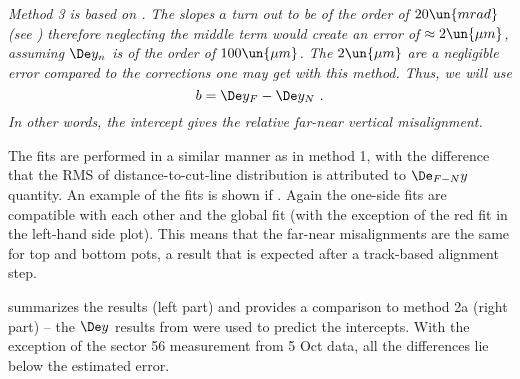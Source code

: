 


\em{Method 3} is based on . The slopes $a$ turn out to be of the order of $20\un{mrad}$ (see ) therefore neglecting the middle term would create an error of $\approx 2\un{\mu m}$, assuming $\De y_n$ is of the order of $100\un{\mu m}$. The $2\un{\mu m}$ are a negligible error compared to the corrections one may get with this method. Thus, we will use
$$b = \De y_F - \De y_N\ .$$
In other words, the intercept gives the relative far-near vertical misalignment.

The fits are performed in a similar manner as in method 1, with the difference that the RMS of distance-to-cut-line distribution is attributed to $\De_{F-N} y$ quantity. An example of the fits is shown if . Again the one-side fits are compatible with each other and the global fit (with the exception of the red fit in the left-hand side plot). This means that the far-near misalignments are the same for top and bottom pots, a result that is expected after a track-based alignment step.

 summarizes the results (left part) and provides a comparison to method 2a (right part) -- the $\De y$ results from  were used to predict the intercepts. With the exception of the sector 56 measurement from 5 Oct data, all the differences lie below the estimated error.


